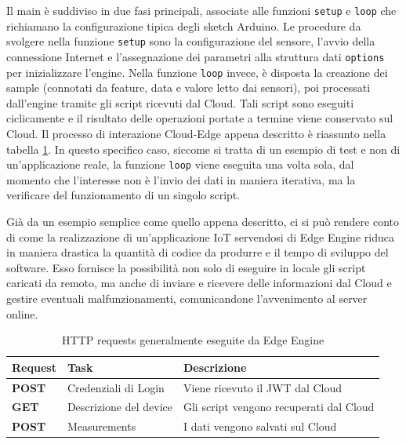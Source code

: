 Il main è suddiviso in due fasi principali, associate alle funzioni \texttt{setup} e \texttt{loop} che richiamano la configurazione tipica degli sketch Arduino. Le procedure da svolgere nella funzione \texttt{setup} sono la configurazione del sensore, l'avvio della connessione Internet e l'assegnazione dei parametri alla struttura dati \texttt{options} per inizializzare l'engine. Nella funzione \texttt{loop} invece, è disposta la creazione dei sample (connotati da feature, data e valore letto dai sensori), poi processati dall'engine tramite gli script ricevuti dal Cloud. Tali script sono eseguiti ciclicamente e il risultato delle operazioni portate a termine viene conservato sul Cloud. Il processo di interazione Cloud-Edge appena descritto è riassunto nella tabella \ref{loop}. In questo specifico caso, siccome si tratta di un esempio di test e non di un'applicazione reale, la funzione \texttt{loop} viene eseguita una volta sola, dal momento che l'interesse non è l'invio dei dati in maniera iterativa, ma la verificare del funzionamento di un singolo script.

Già da un esempio semplice come quello appena descritto, ci si può rendere conto di come la realizzazione di un'applicazione IoT servendosi di Edge Engine riduca in maniera drastica la quantità di codice da produrre e il tempo di sviluppo del software. Esso fornisce la possibilità non solo di eseguire in locale gli script caricati da remoto, ma anche di inviare e ricevere delle informazioni dal Cloud e gestire eventuali malfunzionamenti, comunicandone l'avvenimento al server online.

\begin{table}[H]
	\centering
	\begin{tabular}{|l|l|l|}
		\hline
		\textbf{Request} & \textbf{Task} & \textbf{Descrizione}\\
		\hline
		\textbf{POST} & Credenziali di Login & Viene ricevuto il JWT dal Cloud\\
		\hline
		\textbf{GET} & Descrizione del device & Gli script vengono recuperati dal Cloud\\
		\hline
		\textbf{POST} & Measurements & I dati vengono salvati sul Cloud\\	
		\hline
	\end{tabular}
	\caption{HTTP requests generalmente eseguite da Edge Engine}
	\label{loop}
\end{table}

